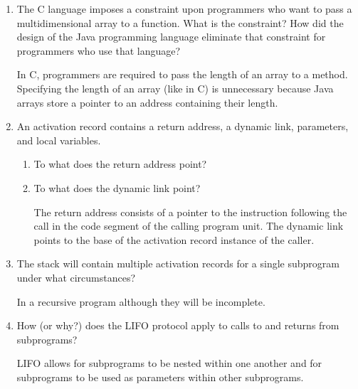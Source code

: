 \begin{enumerate}
  \item The C language imposes a constraint upon programmers
    who want to pass a multidimensional array to a function.
    What is the constraint? How did the design of the Java
    programming language eliminate that constraint for 
    programmers who use that language?

\begin{answer}

    In C, programmers are required to pass the length of an array to a method.
 Specifying the length of an array (like in C) is unnecessary because Java arrays
 store a pointer to an address containing their length.

    \end{answer}

  \item An activation record contains a return
    address, a dynamic link, parameters, and
    local variables.
  \begin{enumerate}
    \item To what does the return address point?
    \item To what does the dynamic link point?

\begin{answer}

    The return address consists of a pointer to the instruction following the call
in the code segment of the calling program unit.  The dynamic link points to the base
of the activation record instance of the caller.

    \end{answer}
    \end{enumerate}

  \item The stack will contain multiple activation
    records for a single subprogram under what
    circumstances?

\begin{answer}

    In a recursive program although they will be incomplete.

    \end{answer}

  \item How (or why?) does the LIFO protocol apply to
    calls to and returns from subprograms?

\begin{answer}

    LIFO allows for subprograms to be nested within one another and for subprograms
to be used as parameters within other subprograms.


\end{answer}
\end{enumerate}
